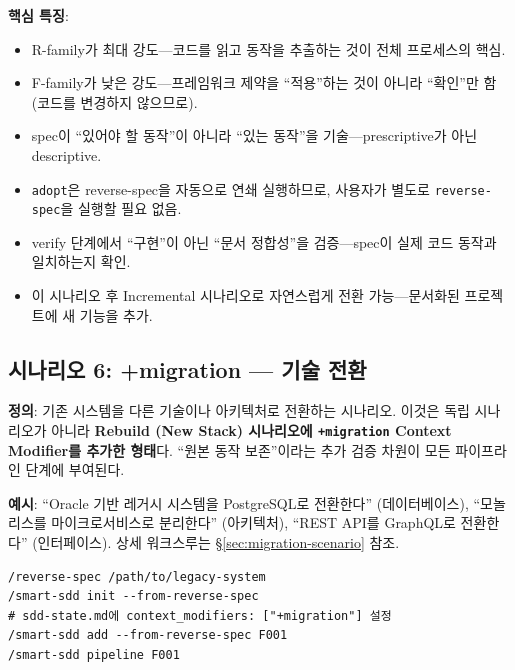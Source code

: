 \documentclass[11pt,a4paper,openright,twoside]{report}
\begin{document}
\textbf{핵심 특징}:
\begin{itemize}[nosep]
  \item R-family가 최대 강도---코드를 읽고 동작을 추출하는 것이 전체 프로세스의 핵심.
  \item F-family가 낮은 강도---프레임워크 제약을 ``적용''하는 것이 아니라 ``확인''만 함 (코드를 변경하지 않으므로).
  \item spec이 ``있어야 할 동작''이 아니라 ``있는 동작''을 기술---prescriptive가 아닌 descriptive.
  \item \texttt{adopt}은 reverse-spec을 자동으로 연쇄 실행하므로, 사용자가 별도로 \texttt{reverse-spec}을 실행할 필요 없음.
  \item verify 단계에서 ``구현''이 아닌 ``문서 정합성''을 검증---spec이 실제 코드 동작과 일치하는지 확인.
  \item 이 시나리오 후 Incremental 시나리오로 자연스럽게 전환 가능---문서화된 프로젝트에 새 기능을 추가.
\end{itemize}


\subsection{시나리오 6: +migration --- 기술 전환}
\label{sec:ref-migration}

\textbf{정의}: 기존 시스템을 다른 기술이나 아키텍처로 전환하는 시나리오. 이것은 독립 시나리오가 아니라 \textbf{Rebuild (New Stack) 시나리오에 \texttt{+migration} Context Modifier를 추가한 형태}다. ``원본 동작 보존''이라는 추가 검증 차원이 모든 파이프라인 단계에 부여된다.

\textbf{예시}: ``Oracle 기반 레거시 시스템을 PostgreSQL로 전환한다'' (데이터베이스), ``모놀리스를 마이크로서비스로 분리한다'' (아키텍처), ``REST API를 GraphQL로 전환한다'' (인터페이스). 상세 워크스루는 \S\ref{sec:migration-scenario} 참조.

\begin{lstlisting}
/reverse-spec /path/to/legacy-system
/smart-sdd init --from-reverse-spec
# sdd-state.md에 context_modifiers: ["+migration"] 설정
/smart-sdd add --from-reverse-spec F001
/smart-sdd pipeline F001
\end{lstlisting}
\end{document}
